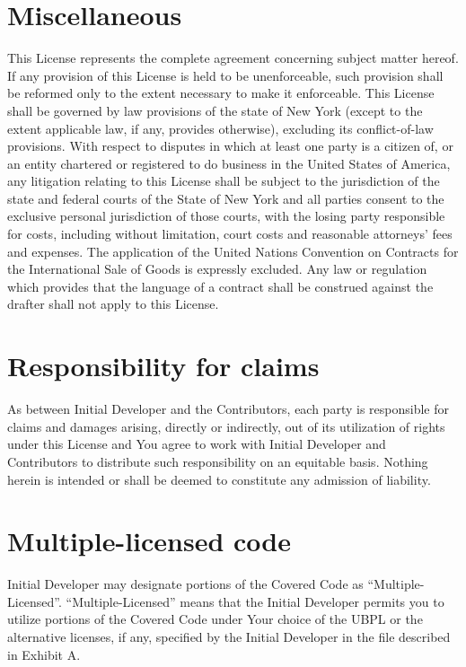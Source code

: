 \documentclass{book}
\begin{document}
\section{Miscellaneous}
This License represents the complete agreement concerning subject matter hereof. If any provision of this License is held to be unenforceable, such provision shall be reformed only to the extent necessary to make it enforceable. This License shall be governed by law provisions of the state of New York (except to the extent applicable law, if any, provides otherwise), excluding its conflict-of-law provisions. With respect to disputes in which at least one party is a citizen of, or an entity chartered or registered to do business in the United States of America, any litigation relating to this License shall be subject to the jurisdiction of the state and federal courts of the State of New York and all parties consent to the exclusive personal jurisdiction of those courts, with the losing party responsible for costs, including without limitation, court costs and reasonable attorneys' fees and expenses. The application of the United Nations Convention on Contracts for the International Sale of Goods is expressly excluded. Any law or regulation which provides that the language of a contract shall be construed against the drafter shall not apply to this License. 

\section{Responsibility for claims}
As between Initial Developer and the Contributors, each party is responsible for claims and damages arising, directly or indirectly, out of its utilization of rights under this License and You agree to work with Initial Developer and Contributors to distribute such responsibility on an equitable basis. Nothing herein is intended or shall be deemed to constitute any admission of liability. 

\section{Multiple-licensed code}
Initial Developer may designate portions of the Covered Code as ``Multiple-Licensed''. ``Multiple-Licensed'' means that the Initial Developer permits you to utilize portions of the Covered Code under Your choice of the UBPL or the alternative licenses, if any, specified by the Initial Developer in the file described in Exhibit A.  
\newpage
{}
\end{document}
